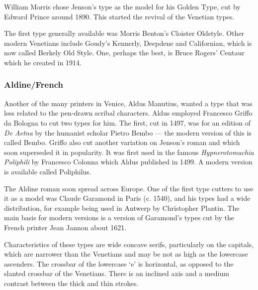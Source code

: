 \documentclass[10pt,letterpaper,extrafontsizes]{memoir}
\begin{document}
    William Morris chose Jenson's 
type as the model
for his Golden Type, cut by Edward 
Prince around 1890. This started the revival of the
Venetian types. 

    The first type generally available was Morris Benton's
Cloister Oldstyle. Other modern Venetians include 
Goudy's Kennerly, 
Deepdene and Californian, which is now
called Berkely Old Style. One, perhaps the best,
is Bruce Rogers' Centaur which he created
in 1914.


\subsubsection{Aldine/French}

    Another of the many printers in Venice, 
Aldus Manutius, wanted a type
that was less related to the pen-drawn scribal characters. Aldus employed
Francesco Griffo da Bologna to cut two types
for him.  The first, cut in 1497, was for an edition of \emph{De Aetna} 
by the humanist scholar Pietro Bembo --- the modern
version of this is called Bembo. Griffo also cut another
variation on Jenson's roman and which soon superseded it 
in popularity.
It was first used in the famous \emph{Hypnerotomachia Poliphili} by
Francesco Colonna which Aldus published in 1499.
A modern version is available called Poliphilus.

The Aldine roman soon spread across Europe. One of the first type
cutters to use it as a model was Claude Garamond in Paris (c. 1540), and his types had a wide distribution,
for example being used in Antwerp by Christopher
Plantin. The main basis for modern
versions is a version of Garamond's types cut by the French printer
Jean Jannon about 1621.

    Characteristics of these types are wide concave serifs, particularly
on the capitals, which are narrower than the Venetians and may be not as high
as the lowercase ascenders. The crossbar of the lowercase `e' is horizontal, 
as opposed to the slanted crossbar of the Venetians. There is an inclined axis
and a medium contrast between the thick and thin strokes.
\end{document}
